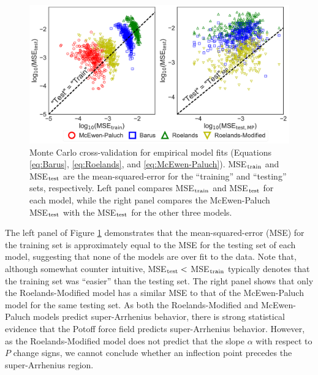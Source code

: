 \documentclass[preprint,review,12pt]{elsarticle}
\begin{document}
	\begin{figure}[htb!]
		\centering
		\includegraphics[width=6.4in]{cross_validation.pdf}
		\caption{Monte Carlo cross-validation for empirical model fits (Equations \ref{eq:Barus}, \ref{eq:Roelands}, and \ref{eq:McEwen-Paluch}). MSE$_{\rm train}$ and MSE$_{\rm test}$ are the mean-squared-error for the ``training'' and ``testing'' sets, respectively. Left panel compares MSE$_{\rm train}$ and MSE$_{\rm test}$ for each model, while the right panel compares the McEwen-Paluch MSE$_{\rm test}$ with the MSE$_{\rm test}$ for the other three models.}
		\label{fig:cross_validation}
	\end{figure}
	
	The left panel of Figure \ref{fig:cross_validation} demonstrates that the mean-squared-error (MSE) for the training set is approximately equal to the MSE for the testing set of each model, suggesting that none of the models are over fit to the data. Note that, although somewhat counter intuitive, MSE$_{\rm test} < $ MSE$_{\rm train}$ typically denotes that the training set was ``easier'' than the testing set. The right panel shows that only the Roelands-Modified model has a similar MSE to that of the McEwen-Paluch model for the same testing set. As both the Roelands-Modified and McEwen-Paluch models predict super-Arrhenius behavior, there is strong statistical evidence that the Potoff force field predicts super-Arrhenius behavior. However, as the Roelands-Modified model does not predict that the slope $\alpha$ with respect to $P$ change signs, we cannot conclude whether an inflection point precedes the super-Arrhenius region.
	
	
	
\end{document}
